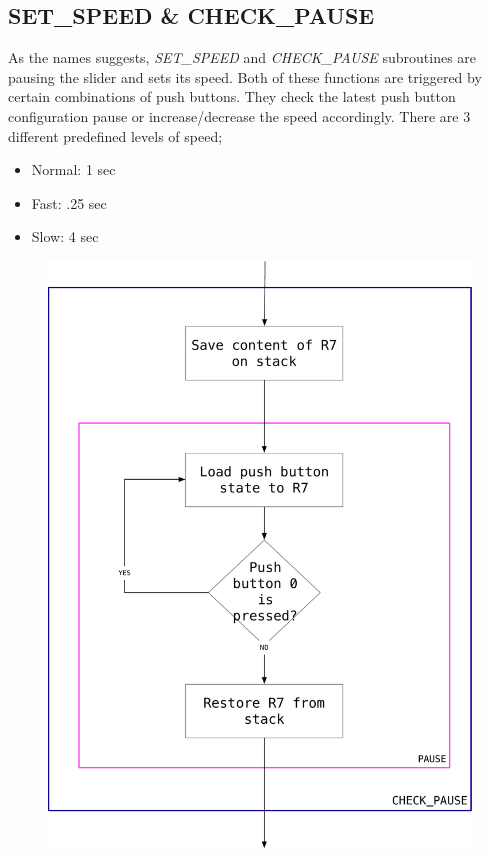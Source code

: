 \documentclass[titlepage]{article}
\begin{document}
	\subsection{SET\_SPEED \& CHECK\_PAUSE}
	As the names suggests, \textit{SET\_SPEED} and \textit{CHECK\_PAUSE} subroutines are pausing the slider and sets its speed. Both of these functions are triggered by certain combinations of push buttons. They check the latest push button configuration pause or increase/decrease the speed accordingly. There are 3 different predefined levels of speed;
	\begin{itemize}
		\item Normal: 1 sec
		\item Fast: .25 sec
		\item Slow: 4 sec
	\end{itemize}
	\begin{figure}[h]
		\begin{minipage}{0.45\textwidth}
			\centering
			\includegraphics[scale=.3]{../images/check_pause.pdf}

\end{minipage}
\end{figure}
\end{document}
